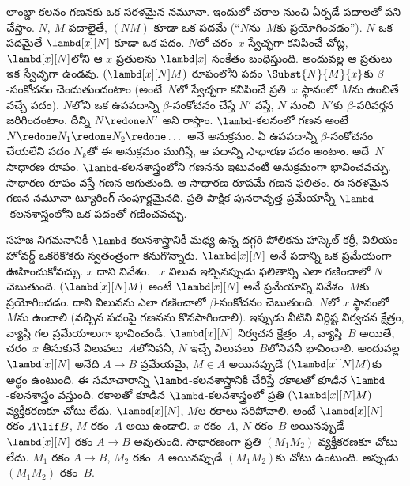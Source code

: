 \documentclass[../../../include/open-logic-section]{subfiles}
\begin{document}


లాంబ్డా కలనం గణనకు ఒక సరళమైన నమూనా. ఇందులో చరాల నుంచి ఏర్పడే పదాలతో పని చేస్తాం. $N$, $M$ పదాలైతే, $(NM)$ కూడా ఒక పదమే (“$N$ను~$M$కు ప్రయోగించడం”). $N$ ఒక పదమైతే $\lambd[x][N]$ కూడా ఒక పదం. $N$లో చరం~$x$ స్వేచ్ఛగా కనిపించే చోట్ల, $\lambd[x][N]$లోని ఆ $x$ ప్రతులను $\lambd[x]$ సంకేతం బంధిస్తుంది. అందువల్ల ఆ ప్రతులు ఇక స్వేచ్ఛగా ఉండవు. $(\lambd[x][N]M)$ రూపంలోని పదం $\Subst{N}{M}{x}$కు $\beta$-సంకోచనం చెందుతుందంటాం (అంటే~$N$లో స్వేచ్ఛగా కనిపించే ప్రతి~$x$ స్థానంలో $M$ను ఉంచితే వచ్చే పదం). $N$లోని ఒక ఉపపదాన్ని $\beta$-సంకోచనం చేస్తే $N'$ వస్తే, $N$ నుంచి~$N'$కు $\beta$-పరివర్తన జరిగిందంటాం. దీన్ని $N \redone N'$ అని రాస్తాం. $\lambd$-కలనంలో గణన అంటే $N \redone N_1
\redone N_2 \redone \dots$ అనే అనుక్రమం. ఏ ఉపపదాన్నీ $\beta$-సంకోచనం చేయలేని పదం $N_k$తో ఈ అనుక్రమం ముగిస్తే, ఆ పదాన్ని \emph{సాధారణ} పదం అంటాం. అదే~$N$ సాధారణ రూపం. $\lambd$-కలనశాస్త్రంలోని గణనను ఇటువంటి అనుక్రమంగా భావించవచ్చు. సాధారణ రూపం వస్తే గణన ఆగుతుంది. ఆ సాధారణ రూపమే గణన ఫలితం. ఈ సరళమైన గణన నమూనా ట్యూరింగ్-సంపూర్ణమైనది. ప్రతి పాక్షిక పునరావృత్త ప్రమేయాన్నీ $\lambd$-కలనశాస్త్రంలోని ఒక పదంతో గణించవచ్చు.

సహజ నిగమనానికీ $\lambd$-కలనశాస్త్రానికీ మధ్య ఉన్న దగ్గరి పోలికను హాస్కెల్ కర్రీ, విలియం హోవర్డ్ ఒకరికొకరు స్వతంత్రంగా కనుగొన్నారు. $\lambd[x][N]$ అనే పదాన్ని ఒక ప్రమేయంగా ఊహించుకోవచ్చు. $x$ దాని నివేశం. ~$x$ విలువ ఇచ్చినప్పుడు ఫలితాన్ని ఎలా గణించాలో $N$ చెబుతుంది. $(\lambd[x][N]M)$ అంటే $\lambd[x][N]$ అనే ప్రమేయాన్ని నివేశం~$M$కు ప్రయోగించడం. దాని విలువను ఎలా గణించాలో $\beta$-సంకోచనం చెబుతుంది. $N$లో $x$ స్థానంలో~$M$ను ఉంచాలి (వచ్చిన పదంపై గణనను కొనసాగించాలి). ఇప్పుడు వీటిని నిర్దిష్ట నిర్వచన క్షేత్రం, వ్యాప్తి గల ప్రమేయాలుగా భావించండి. $\lambd[x][N]$ నిర్వచన క్షేత్రం~$A$, వ్యాప్తి~$B$ అయితే, చరం~$x$ తీసుకునే విలువలు~$A$లోనివనీ, $N$ ఇచ్చే విలువలు~$B$లోనివనీ భావించాలి. అందువల్ల $\lambd[x][N]$ అనేది $A \to B$ ప్రమేయమై, $M \in A$ అయినప్పుడే $(\lambd[x][N]M)$కు అర్థం ఉంటుంది. ఈ సమాచారాన్ని $\lambd$-కలనశాస్త్రానికి చేరిస్తే \emph{రకాలతో కూడిన} $\lambd$-కలనశాస్త్రం వస్తుంది. రకాలతో కూడిన $\lambd$-కలనశాస్త్రంలో ప్రతి $(\lambd[x][N]M)$ వ్యక్తీకరణకూ చోటు లేదు. $\lambd[x][N]$, $M$ల రకాలు సరిపోవాలి. అంటే $\lambd[x][N]$ రకం $A \lif B$, $M$ రకం~$A$ అయి ఉండాలి. $x$ రకం~$A$, $N$ రకం~$B$ అయినప్పుడే $\lambd[x][N]$ రకం $A \to B$ అవుతుంది. సాధారణంగా ప్రతి $(M_1M_2)$ వ్యక్తీకరణకూ చోటు లేదు. $M_1$ రకం $A \to B$, $M_2$ రకం~$A$ అయినప్పుడే $(M_1M_2)$కు చోటు ఉంటుంది. అప్పుడు $(M_1M_2)$ రకం~$B$.
\end{document}
